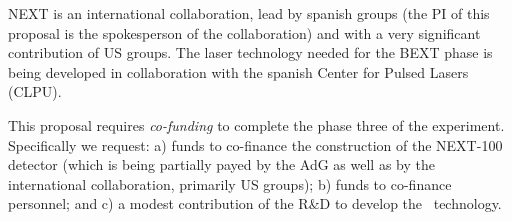 NEXT is an international collaboration, lead by spanish groups (the PI of this proposal is the spokesperson of the collaboration) and with a very significant contribution of US groups. The laser technology needed for the BEXT phase is being developed in collaboration with the spanish Center for Pulsed Lasers (CLPU). 

 This proposal requires {\em co-funding} to complete the phase three of the experiment. Specifically we request: a) funds to co-finance the construction of the NEXT-100 detector (which is being partially payed by the AdG as well as by the international collaboration, primarily US groups); b) funds to co-finance personnel; and c) a modest contribution of the R\&D to develop the \BATA\ technology.   

